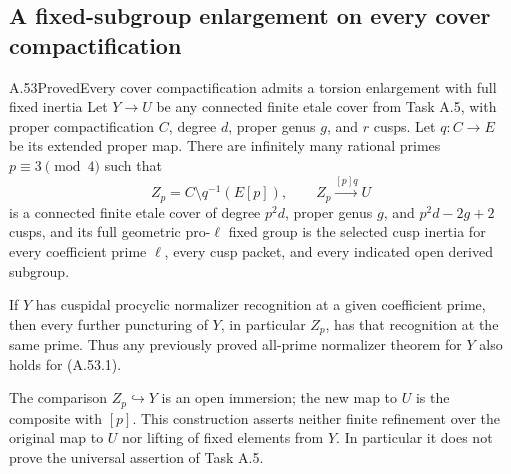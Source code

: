 \subsection{A fixed-subgroup enlargement on every cover compactification}

\begin{statement}{A.53}{Proved}{Every cover compactification admits a torsion enlargement with full fixed inertia}
Let \(Y\to U\) be any connected finite etale cover from Task A.5,
with proper compactification \(C\), degree \(d\), proper genus
\(g\), and \(r\) cusps. Let \(q:C\to E\) be its extended
proper map. There are infinitely many rational primes
\(p\equiv3\pmod4\) such that
\[
       Z_p=C\setminus q^{-1}(E[p]),\qquad
                    Z_p\xrightarrow{[p]q}U             \tag{A.53.1}
\]
is a connected finite etale cover of degree \(p^2d\), proper genus
\(g\), and \(p^2d-2g+2\) cusps, and its full geometric
pro-\(\ell\) fixed group is the selected cusp inertia for every
coefficient prime \(\ell\), every cusp packet, and every indicated
open derived subgroup.

If \(Y\) has cuspidal procyclic normalizer recognition at a given
coefficient prime, then every further puncturing of \(Y\), in
particular \(Z_p\), has that recognition at the same prime.
Thus any previously proved all-prime normalizer theorem for \(Y\)
also holds for (A.53.1).

The comparison \(Z_p\hookrightarrow Y\) is an open immersion;
the new map to \(U\) is the composite with \([p]\). This construction
asserts neither finite refinement over the original map to \(U\)
nor lifting of fixed elements from \(Y\). In particular it does
not prove the universal assertion of Task A.5.
\end{statement}

